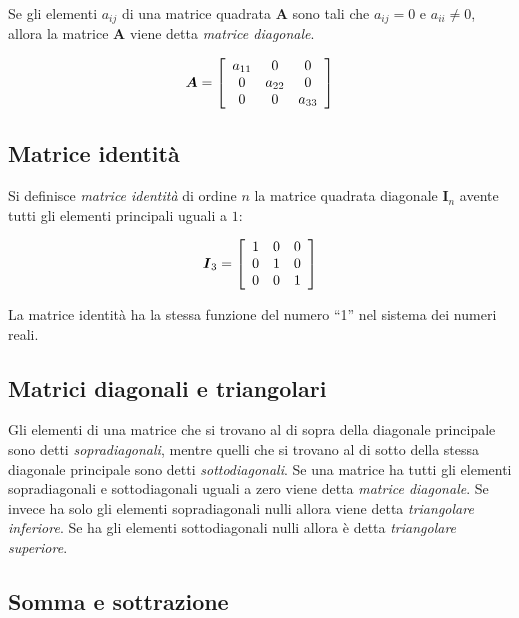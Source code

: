 \documentclass[
  11pt,
]{krantz}
\theoremstyle{definition}
\theoremstyle{definition}
\theoremstyle{definition}
\theoremstyle{definition}
\theoremstyle{remark}
\begin{document}
Se gli elementi \(a_{ij}\) di una matrice quadrata \(\boldsymbol{A}\) sono tali che \(a_{ij} =0\) e \(a_{ii} \neq 0\), allora la matrice \(\boldsymbol{A}\) viene detta \emph{matrice diagonale}.

\[
\boldsymbol{A} =  \left[ \begin{array}{c c c}
a_{11} & 0 & 0\\
0 & a_{22} & 0\\
0 & 0 & a_{33} \end{array} \right]
\]

\hypertarget{matrice-identituxe0}{%
\subsection{Matrice identità}\label{matrice-identituxe0}}

Si definisce \emph{matrice identità} di ordine \(n\) la matrice quadrata diagonale \(\boldsymbol{I}_n\) avente tutti gli elementi principali uguali a \(1\):

\[
\boldsymbol{I}_3 =  \left[ \begin{array}{c c c}
1 & 0 & 0\\
0 & 1 & 0\\
0 & 0 & 1 \end{array} \right]
\]

La matrice identità ha la stessa funzione del numero ``1'' nel sistema dei numeri reali.

\hypertarget{matrici-diagonali-e-triangolari}{%
\subsection{Matrici diagonali e triangolari}\label{matrici-diagonali-e-triangolari}}

Gli elementi di una matrice che si trovano al di sopra della diagonale principale sono detti \emph{sopradiagonali}, mentre quelli che si trovano al di sotto della stessa diagonale principale sono detti \emph{sottodiagonali}. Se una matrice ha tutti gli elementi sopradiagonali e sottodiagonali uguali a zero viene detta \emph{matrice diagonale}. Se invece ha solo gli elementi sopradiagonali nulli allora viene detta \emph{triangolare inferiore}. Se ha gli elementi sottodiagonali nulli allora è detta \emph{triangolare superiore}.

\hypertarget{somma-e-sottrazione}{%
\subsection{Somma e sottrazione}\label{somma-e-sottrazione}}
\end{document}
